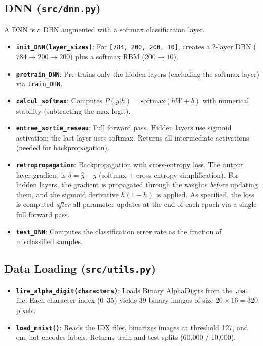\documentclass[11pt,a4paper]{article}
\begin{document}
\subsection{DNN (\texttt{src/dnn.py})}

A DNN is a DBN augmented with a softmax classification layer.

\begin{itemize}
    \item \textbf{\texttt{init\_DNN(layer\_sizes)}}: For \texttt{[784, 200, 200, 10]}, creates a 2-layer DBN ($784 \to 200 \to 200$) plus a softmax RBM ($200 \to 10$).
    \item \textbf{\texttt{pretrain\_DNN}}: Pre-trains only the hidden layers (excluding the softmax layer) via \texttt{train\_DBN}.
    \item \textbf{\texttt{calcul\_softmax}}: Computes $P(y|h) = \mathrm{softmax}(hW + b)$ with numerical stability (subtracting the max logit).
    \item \textbf{\texttt{entree\_sortie\_reseau}}: Full forward pass. Hidden layers use sigmoid activation; the last layer uses softmax. Returns all intermediate activations (needed for backpropagation).
    \item \textbf{\texttt{retropropagation}}: Backpropagation with cross-entropy loss. The output layer gradient is $\delta = \hat{y} - y$ (softmax + cross-entropy simplification). For hidden layers, the gradient is propagated through the weights \emph{before} updating them, and the sigmoid derivative $h(1-h)$ is applied. As specified, the loss is computed \emph{after} all parameter updates at the end of each epoch via a single full forward pass.
    \item \textbf{\texttt{test\_DNN}}: Computes the classification error rate as the fraction of misclassified samples.
\end{itemize}

\subsection{Data Loading (\texttt{src/utils.py})}

\begin{itemize}
    \item \textbf{\texttt{lire\_alpha\_digit(characters)}}: Loads Binary AlphaDigits from the \texttt{.mat} file. Each character index (0--35) yields 39 binary images of size $20 \times 16 = 320$ pixels.
    \item \textbf{\texttt{load\_mnist()}}: Reads the IDX files, binarizes images at threshold 127, and one-hot encodes labels. Returns train and test splits (60,000 / 10,000).
\end{itemize}
\end{document}
